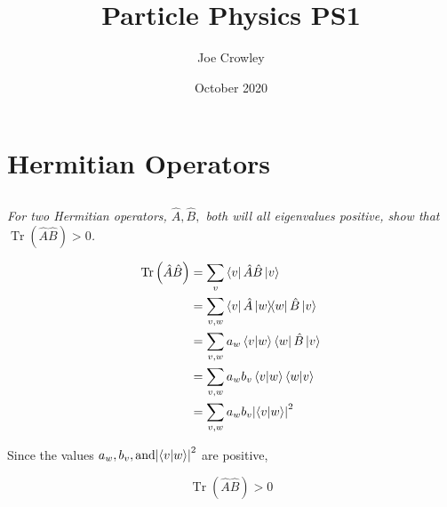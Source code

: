 \documentclass[12pt, letterpaper]{article}
\title{Particle Physics PS1}
\author{Joe Crowley}
\date{October 2020}
\begin{document}
  

\section{Hermitian Operators}
\subsection{}
\textit{For two Hermitian operators, $\hat{A}, \hat{B},$ both will all eigenvalues positive, show that $\operatorname{Tr}(\hat{A} \hat{B})>0$. }

\begin{equation*}
\begin{split}
    \operatorname{Tr}\left(\hat{A}\hat{B}\right) &= \sum_v \bra{v}\hat{A}\hat{B}\ket{v}\\
    &= \sum_{v,w} \bra{v}\hat{A}\ketbra{w}\hat{B}\ket{v}\\
    &= \sum_{v,w} a_w\braket{v}{w}\bra{w}\hat{B}\ket{v}\\
    &= \sum_{v,w}  a_w b_v\braket{v}{w}\braket{w}{v}\\
    &= \sum_{v,w}  a_w b_v{\left|\braket{v}{w}\right| }^2
\end{split}
\end{equation*}

Since the values $ a_w, b_v, \text{and} {\left|\braket{v}{w}\right| }^2$ are positive, 

$$
    \operatorname{Tr}\left(\hat{A}\hat{B}\right) >0
$$
\end{document}

